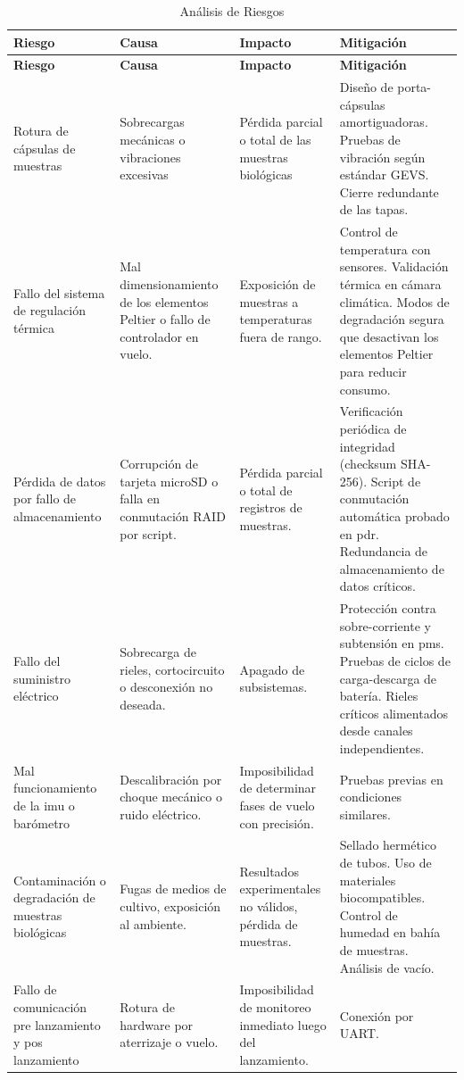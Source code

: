     \begin{longtable}{ | m{2.5cm} | m{3cm} | m{3cm} | m{6cm} | }
      \caption{Análisis de Riesgos} \label{tab:analisis_riesgos} \\
      \hline
      \textbf{Riesgo} & \textbf{Causa} & \textbf{Impacto} & \textbf{Mitigación} \\
      \hline
      \endfirsthead

      \hline
      \textbf{Riesgo} & \textbf{Causa} & \textbf{Impacto} & \textbf{Mitigación} \\
      \hline
      \endhead

      \hline
      \endfoot

      \hline
      \endlastfoot

      Rotura de cápsulas de muestras & Sobrecargas mecánicas o vibraciones excesivas & Pérdida parcial o total de las muestras biológicas & Diseño de porta-cápsulas amortiguadoras. Pruebas de vibración según estándar GEVS. Cierre redundante de las tapas. \\
      \hline
      Fallo del sistema de regulación térmica & Mal dimensionamiento de los elementos Peltier o fallo de controlador en vuelo. & Exposición de muestras a temperaturas fuera de rango. & Control de temperatura con sensores. Validación térmica en cámara climática. Modos de degradación segura que desactivan los elementos Peltier para reducir consumo. \\
      \hline
      Pérdida de datos por fallo de almacenamiento & Corrupción de tarjeta microSD o falla en conmutación RAID por script. & Pérdida parcial o total de registros de muestras. & Verificación periódica de integridad (checksum SHA-256). Script de conmutación automática probado en \acrshort{pdr}. Redundancia de almacenamiento de datos críticos. \\
      \hline
      Fallo del suministro eléctrico & Sobrecarga de rieles, cortocircuito o desconexión no deseada. & Apagado de subsistemas. & Protección contra sobre-corriente y subtensión en \acrshort{pms}. Pruebas de ciclos de carga-descarga de batería. Rieles críticos alimentados desde canales independientes. \\
      \hline
      Mal funcionamiento de la \acrshort{imu} o barómetro & Descalibración por choque mecánico o ruido eléctrico. & Imposibilidad de determinar fases de vuelo con precisión. & Pruebas previas en condiciones similares. \\
      \hline
      Contaminación o degradación de muestras biológicas & Fugas de medios de cultivo, exposición al ambiente. & Resultados experimentales no válidos, pérdida de muestras. & Sellado hermético de tubos. Uso de materiales biocompatibles. Control de humedad en bahía de muestras. Análisis de vacío. \\
      \hline
      Fallo de comunicación pre lanzamiento y pos lanzamiento  & Rotura de hardware por aterrizaje o vuelo. & Imposibilidad de monitoreo inmediato luego del lanzamiento. & Conexión por UART. \\
      \hline
    \end{longtable}

